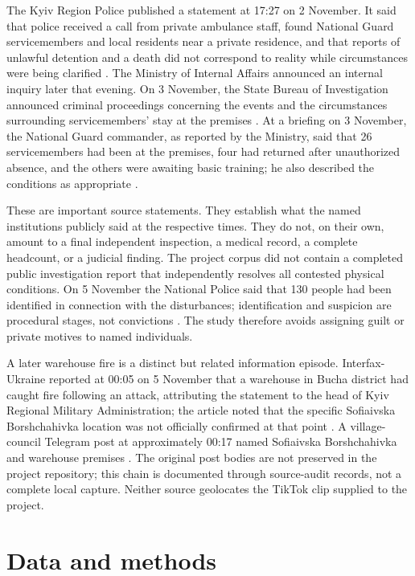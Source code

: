 The Kyiv Region Police published a statement at 17:27 on 2 November. It said that police received a call from private ambulance staff, found National Guard servicemembers and local residents near a private residence, and that reports of unlawful detention and a death did not correspond to reality while circumstances were being clarified \citep{npu2026statement}. The Ministry of Internal Affairs announced an internal inquiry later that evening. On 3 November, the State Bureau of Investigation announced criminal proceedings concerning the events and the circumstances surrounding servicemembers' stay at the premises \citep{dbr2026proceeding}. At a briefing on 3 November, the National Guard commander, as reported by the Ministry, said that 26 servicemembers had been at the premises, four had returned after unauthorized absence, and the others were awaiting basic training; he also described the conditions as appropriate \citep{mvs2026briefing}.

These are important source statements. They establish what the named institutions publicly said at the respective times. They do not, on their own, amount to a final independent inspection, a medical record, a complete headcount, or a judicial finding. The project corpus did not contain a completed public investigation report that independently resolves all contested physical conditions. On 5 November the National Police said that 130 people had been identified in connection with the disturbances; identification and suspicion are procedural stages, not convictions \citep{npu2026identified}. The study therefore avoids assigning guilt or private motives to named individuals.

A later warehouse fire is a distinct but related information episode. Interfax-Ukraine reported at 00:05 on 5 November that a warehouse in Bucha district had caught fire following an attack, attributing the statement to the head of Kyiv Regional Military Administration; the article noted that the specific Sofiaivska Borshchahivka location was not officially confirmed at that point \citep{interfax2026fire}. A village-council Telegram post at approximately 00:17 named Sofiaivska Borshchahivka and warehouse premises \citep{village2026fire}. The original post bodies are not preserved in the project repository; this chain is documented through source-audit records, not a complete local capture. Neither source geolocates the TikTok clip supplied to the project.

\section{Data and methods}

